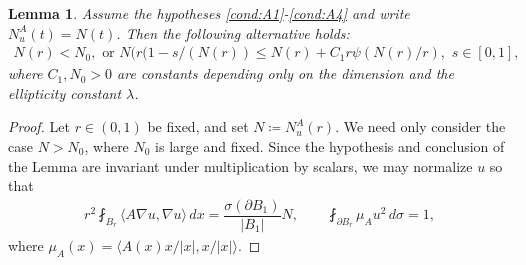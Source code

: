 \documentclass[12pt,leqno]{amsart}
\numberwithin{equation}{section}
\newtheorem{lemma}{Lemma}[section]
\theoremstyle{definition}
\newcommand{\abs}[1]{\left \lvert #1 \right \rvert}
\begin{document}
	
	\begin{lemma}\label{lem:dichot}
		Assume the hypotheses \ref{cond:A1}-\ref{cond:A4} and write $N_u^A(t) = N(t)$. Then the following alternative holds:
		\begin{align*}
			N(r) < N_0, \text{ or } N(  r (1 - s/(N(r) ) \le N(r) + C_1 r \psi(N(r)/r), \, \, s \in [0,1],
		\end{align*}
		where $C_1, N_0 > 0$ are constants depending only on the dimension and the ellipticity constant $\lambda$.
	\end{lemma}
	\begin{proof}
		Let $r \in (0,1)$ be fixed, and set $N \coloneqq N_u^A(r)$. We need only consider the case $N > N_0$, where $N_0$ is large and fixed. Since the hypothesis and conclusion of the Lemma are invariant under multiplication by scalars, we may normalize $u$ so that 
		\begin{align*}
			r^2 \fint_{B_r} \langle A \nabla u, \nabla u \rangle \, dx =  \dfrac{\sigma(\partial B_1)}{\abs{B_1}} N, \qquad   \fint_{\partial B_r} \mu_A u^2 \, d\sigma = 1,
		\end{align*}
		where $\mu_A(x) = \langle A(x) x/\abs{x}, x/\abs{x} \rangle$.
		

\end{proof}
\end{document}
